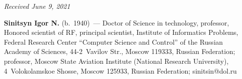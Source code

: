 \vspace*{-12pt}

\hfill{\small\textit{Received June 9, 2021}}


\pagebreak

\Contrl

\noindent
\textbf{Sinitsyn Igor N.} (b.\ 1940)~--- 
Doctor of Science in technology, professor, Honored scientist of RF, principal scientist,
 Institute of Informatics Problems, Federal Research Center ``Computer Science and Control'' 
 of the Russian Academy of Sciences, 44-2~Vavilov Str., Moscow 119333, Russian Federation; professor,
  Moscow State Aviation Institute (National Research University), 4~Volokolamskoe Shosse, Moscow 125933, 
  Russian Federation; \mbox{sinitsin@dol.ru}
  
\label{end\stat}


\renewcommand{\bibname}{\protect\rm Литература}   
\renewcommand{\figurename}{\protect\bf Рис.}
\renewcommand{\tablename}{\protect\bf Таблица}